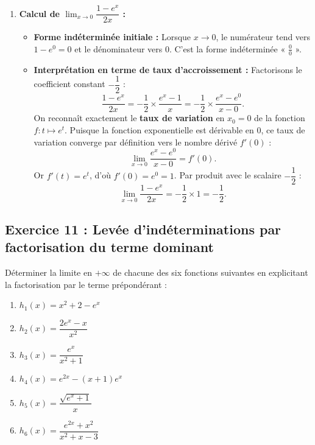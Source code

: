 \documentclass[11pt,a4paper]{article}
\begin{document}
\begin{correctionbox}[Exercice 10]
\begin{enumerate}[label=\textbf{\arabic*.}]
    \item \textbf{Calcul de $\lim_{x \to 0} \dfrac{1 - e^x}{2x}$ :}
    \begin{itemize}
        \item \textbf{Forme indéterminée initiale :} Lorsque $x \to 0$, le numérateur tend vers $1 - e^0 = 0$ et le dénominateur vers 0. C'est la forme indéterminée « $\frac{0}{0}$ ».
        \item \textbf{Interprétation en terme de taux d'accroissement :}
        Factorisons le coefficient constant $-\dfrac{1}{2}$ :
        \[
        \frac{1 - e^x}{2x} = -\frac{1}{2} \times \frac{e^x - 1}{x} = -\frac{1}{2} \times \frac{e^x - e^0}{x - 0}.
        \]
        On reconnaît exactement le \textbf{taux de variation} en $x_0 = 0$ de la fonction $f : t \mapsto e^t$.
        Puisque la fonction exponentielle est dérivable en $0$, ce taux de variation converge par définition vers le nombre dérivé $f'(0)$ :
        \[
        \lim_{x \to 0} \frac{e^x - e^0}{x - 0} = f'(0).
        \]
        Or $f'(t) = e^t$, d'où $f'(0) = e^0 = 1$.
        Par produit avec le scalaire $-\dfrac{1}{2}$ :
        \[
        \boxed{\lim_{x \to 0} \frac{1 - e^x}{2x} = -\frac{1}{2} \times 1 = -\frac{1}{2}}.
        \]
    \end{itemize}
\end{enumerate}
\end{correctionbox}

\subsection*{Exercice 11 : Levée d'indéterminations par factorisation du terme dominant}

Déterminer la limite en $+\infty$ de chacune des six fonctions suivantes en explicitant la factorisation par le terme prépondérant :
\begin{enumerate}[label=\textbf{\arabic*.}]
    \item $h_1(x) = x^2 + 2 - e^x$
    \item $h_2(x) = \dfrac{2e^x - x}{x^2}$
    \item $h_3(x) = \dfrac{e^x}{x^2 + 1}$
    \item $h_4(x) = e^{2x} - (x+1)e^x$
    \item $h_5(x) = \dfrac{\sqrt{e^x + 1}}{x}$
    \item $h_6(x) = \dfrac{e^{2x} + x^2}{x^2 + x - 3}$
\end{enumerate}
\end{document}
